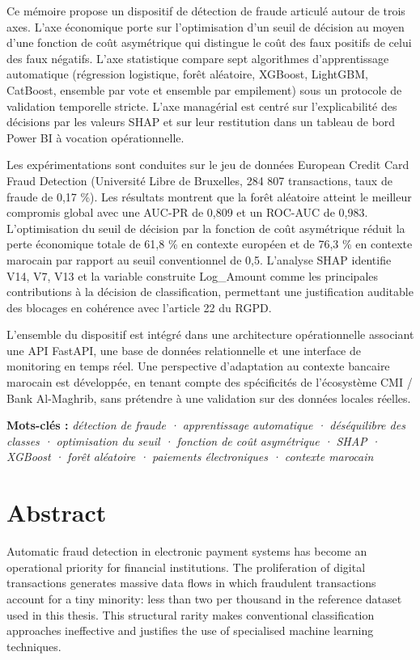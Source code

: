 Ce mémoire propose un dispositif de détection de fraude articulé autour de trois axes. L'axe économique porte sur l'optimisation d'un seuil de décision au moyen d'une fonction de coût asymétrique qui distingue le coût des faux positifs de celui des faux négatifs. L'axe statistique compare sept algorithmes d'apprentissage automatique (régression logistique, forêt aléatoire, XGBoost, LightGBM, CatBoost, ensemble par vote et ensemble par empilement) sous un protocole de validation temporelle stricte. L'axe managérial est centré sur l'explicabilité des décisions par les valeurs SHAP et sur leur restitution dans un tableau de bord Power BI à vocation opérationnelle.

Les expérimentations sont conduites sur le jeu de données European Credit Card Fraud Detection (Université Libre de Bruxelles, 284 807 transactions, taux de fraude de 0,17 \%). Les résultats montrent que la forêt aléatoire atteint le meilleur compromis global avec une AUC-PR de 0,809 et un ROC-AUC de 0,983. L'optimisation du seuil de décision par la fonction de coût asymétrique réduit la perte économique totale de 61,8 \% en contexte européen et de 76,3 \% en contexte marocain par rapport au seuil conventionnel de 0,5. L'analyse SHAP identifie V14, V7, V13 et la variable construite Log\_Amount comme les principales contributions à la décision de classification, permettant une justification auditable des blocages en cohérence avec l'article 22 du RGPD.

L'ensemble du dispositif est intégré dans une architecture opérationnelle associant une API FastAPI, une base de données relationnelle et une interface de monitoring en temps réel. Une perspective d'adaptation au contexte bancaire marocain est développée, en tenant compte des spécificités de l'écosystème CMI / Bank Al-Maghrib, sans prétendre à une validation sur des données locales réelles.

\textbf{Mots-clés : }\emph{détection de fraude · apprentissage automatique · déséquilibre des classes · optimisation du seuil · fonction de coût asymétrique · SHAP · }\emph{XGBoost}\emph{ · forêt aléatoire · paiements électroniques · contexte marocain}

\chapter*{Abstract}

Automatic fraud detection in electronic payment systems has become an operational priority for financial institutions. The proliferation of digital transactions generates massive data flows in which fraudulent transactions account for a tiny minority: less than two per thousand in the reference dataset used in this thesis. This structural rarity makes conventional classification approaches ineffective and justifies the use of specialised machine learning techniques.

